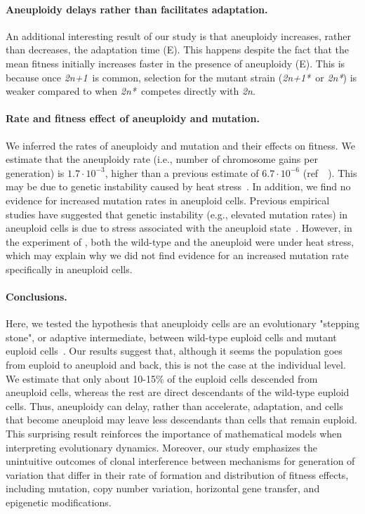 \documentclass[12pt]{extarticle}
\newcommand{\euwt}{\emph{2n}}
\newcommand{\anwt}{\emph{2n+1}}
\newcommand{\eumt}{\emph{2n*}}
\newcommand{\anmt}{\emph{2n+1*}}
\begin{document}
\paragraph{Aneuploidy delays rather than facilitates adaptation.}
An additional interesting result of our study is that aneuploidy increases, rather than decreases, the adaptation time (E). 
This happens despite the fact that the mean fitness initially increases faster in the presence of aneuploidy (E). 
This is because once \anwt\ is common, selection for the mutant strain (\anmt\ or \eumt) is weaker compared to when \eumt\ competes directly with \euwt.

\paragraph{Rate and fitness effect of aneuploidy and mutation.}
We inferred the rates of aneuploidy and mutation and their effects on fitness. 
We estimate that the aneuploidy rate (i.e., number of chromosome gains per generation) is $1.7 \cdot 10^{-3}$, higher than a previous estimate of $6.7 \cdot 10^{-6}$ (ref~~\citep{Zhu2016}). This may be due to genetic instability caused by heat stress~\citep{Chen2012a}.
In addition, we find no evidence for increased mutation rates in aneuploid cells. 
Previous empirical studies have suggested that genetic instability (e.g., elevated mutation rates) in aneuploid cells is due to stress associated with the aneuploid state~\citep{Bouchonville2009, Chen2012b, Zhu2012, Ippolito2021b}.
However, in the experiment of \citet{Yona2012}, both the wild-type and the aneuploid were under heat stress, which may explain why we did not find evidence for an increased mutation rate specifically in aneuploid cells.

\paragraph{Conclusions.}
Here, we tested the hypothesis that aneuploidy cells are an evolutionary "stepping stone", or adaptive intermediate, between wild-type euploid cells and mutant euploid cells~\citep{Yona2015}. 
Our results suggest that, although it seems the population goes from euploid to aneuploid and back, this is not the case at the individual level. We estimate that only about 10-15\% of the euploid cells descended from aneuploid cells, whereas the rest are direct descendants of the wild-type euploid cells.
Thus, aneuploidy can delay, rather than accelerate, adaptation, and cells that become aneuploid may leave less descendants than cells that remain euploid. 
This surprising result reinforces the importance of mathematical models when interpreting evolutionary dynamics.
Moreover, our study emphasizes the unintuitive outcomes of clonal interference  between mechanisms for generation of variation that differ in their rate of formation and distribution of fitness effects, including mutation, copy number variation, horizontal gene transfer, and epigenetic modifications. 
\end{document}

